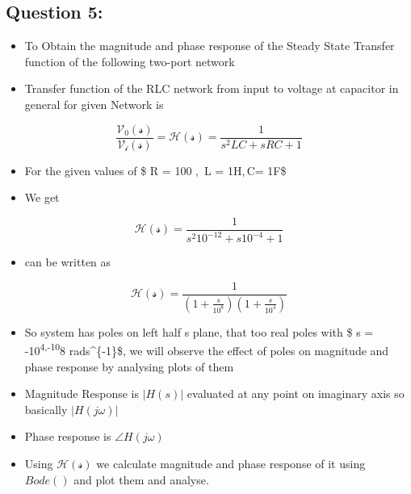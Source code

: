 \documentclass[11pt]{article}
\providecommand{\tightlist}{%
      \setlength{\itemsep}{0pt}\setlength{\parskip}{0pt}}
\begin{document}
    \subsection{Question 5:}\label{question-5}

\begin{itemize}
\item
  To Obtain the magnitude and phase response of the Steady State
  Transfer function of the following two-port network
\item
  Transfer function of the RLC network from input to voltage at
  capacitor in general for given Network is
\end{itemize}

\begin{equation}
    \frac{\mathcal{V_{0}(s)}}{\mathcal{V_{i}(s)}} = \mathcal{H(s)} = \frac{1}{s^{2}LC + sRC + 1}
\end{equation}

\begin{itemize}
\item
  For the given values of \$ R = 100 \Omega\(,\) L = 1\mu H\(,\)C=
  1\mu F\$
\item
  We get
\end{itemize}

\begin{equation}
    \mathcal{H(s)} = \frac{1}{s^{2}10^{-12} + s10^{-4} + 1}
\end{equation}

\begin{itemize}
\tightlist
\item
  can be written as
\end{itemize}

\begin{equation}
    \mathcal{H(s)} = \frac{1}{(1 + \frac{s}{10^{8}})(1 + \frac{s}{10^{4}})}
\end{equation}

\begin{itemize}
\item
  So system has poles on left half s plane, that too real poles with \$
  s = -10\textsuperscript{4,-10}8 rads\^{}\{-1\}\$, we will observe the
  effect of poles on magnitude and phase response by analysing plots of
  them
\item
  Magnitude Response is \(|H(s)|\) evaluated at any point on imaginary
  axis so basically \(|H(j\omega)|\)
\item
  Phase response is \(\angle H(j\omega)\)
\item
  Using \(\mathcal{H(s)}\) we calculate magnitude and phase response of
  it using \(Bode()\) and plot them and analyse.
\end{itemize}
\end{document}
